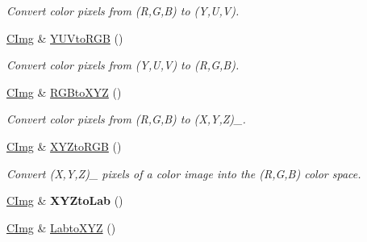 \begin{DoxyCompactItemize}
\begin{DoxyCompactList}\small\item\em Convert color pixels from (R,G,B) to (Y,U,V). \item\end{DoxyCompactList}\item 
\hypertarget{structcimg__library_1_1_c_img_a98cd009f19e7d2afc9f8ae44a3fff079}{
\hyperlink{structcimg__library_1_1_c_img}{CImg} \& \hyperlink{structcimg__library_1_1_c_img_a98cd009f19e7d2afc9f8ae44a3fff079}{YUVtoRGB} ()}
\label{structcimg__library_1_1_c_img_a98cd009f19e7d2afc9f8ae44a3fff079}

\begin{DoxyCompactList}\small\item\em Convert color pixels from (Y,U,V) to (R,G,B). \item\end{DoxyCompactList}\item 
\hypertarget{structcimg__library_1_1_c_img_a1abc595ceffae87a27935a3132aa3162}{
\hyperlink{structcimg__library_1_1_c_img}{CImg} \& \hyperlink{structcimg__library_1_1_c_img_a1abc595ceffae87a27935a3132aa3162}{RGBtoXYZ} ()}
\label{structcimg__library_1_1_c_img_a1abc595ceffae87a27935a3132aa3162}

\begin{DoxyCompactList}\small\item\em Convert color pixels from (R,G,B) to (X,Y,Z)\_. \item\end{DoxyCompactList}\item 
\hypertarget{structcimg__library_1_1_c_img_a2dab17374e2b1930b74852a58ec124e1}{
\hyperlink{structcimg__library_1_1_c_img}{CImg} \& \hyperlink{structcimg__library_1_1_c_img_a2dab17374e2b1930b74852a58ec124e1}{XYZtoRGB} ()}
\label{structcimg__library_1_1_c_img_a2dab17374e2b1930b74852a58ec124e1}

\begin{DoxyCompactList}\small\item\em Convert (X,Y,Z)\_ pixels of a color image into the (R,G,B) color space. \item\end{DoxyCompactList}\item 
\hypertarget{structcimg__library_1_1_c_img_ab98f0e76e7e3a0faba9317edf291c05d}{
\hyperlink{structcimg__library_1_1_c_img}{CImg} \& {\bfseries XYZtoLab} ()}
\label{structcimg__library_1_1_c_img_ab98f0e76e7e3a0faba9317edf291c05d}

\item 
\hypertarget{structcimg__library_1_1_c_img_a95c5de084219d3c76ef0e311b2ce75c3}{
\hyperlink{structcimg__library_1_1_c_img}{CImg} \& \hyperlink{structcimg__library_1_1_c_img_a95c5de084219d3c76ef0e311b2ce75c3}{LabtoXYZ} ()}
\label{structcimg__library_1_1_c_img_a95c5de084219d3c76ef0e311b2ce75c3}


\end{DoxyCompactItemize}
